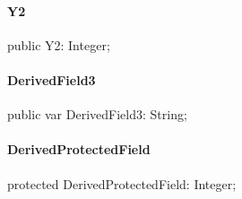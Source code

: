 \documentclass{report}
\begin{document}
\paragraph*{Y2}\hspace*{\fill}

\begin{list}{}{
\setlength{\itemindent}{0cm}
\setlength{\listparindent}{0cm}
\setlength{\leftmargin}{\evensidemargin}
\addtolength{\leftmargin}{\tmplength}
\settowidth{\labelsep}{X}
\addtolength{\leftmargin}{\labelsep}
\setlength{\labelwidth}{\tmplength}
}
\begin{flushleft}
\item[\textbf{Declaration}\hfill]
\begin{ttfamily}
public Y2: Integer;\end{ttfamily}


\end{flushleft}
\end{list}
\paragraph*{DerivedField3}\hspace*{\fill}

\begin{list}{}{
\setlength{\itemindent}{0cm}
\setlength{\listparindent}{0cm}
\setlength{\leftmargin}{\evensidemargin}
\addtolength{\leftmargin}{\tmplength}
\settowidth{\labelsep}{X}
\addtolength{\leftmargin}{\labelsep}
\setlength{\labelwidth}{\tmplength}
}
\begin{flushleft}
\item[\textbf{Declaration}\hfill]
\begin{ttfamily}
public var DerivedField3: String;\end{ttfamily}


\end{flushleft}
\end{list}
\paragraph*{DerivedProtectedField}\hspace*{\fill}

\begin{list}{}{
\setlength{\itemindent}{0cm}
\setlength{\listparindent}{0cm}
\setlength{\leftmargin}{\evensidemargin}
\addtolength{\leftmargin}{\tmplength}
\settowidth{\labelsep}{X}
\addtolength{\leftmargin}{\labelsep}
\setlength{\labelwidth}{\tmplength}
}
\begin{flushleft}
\item[\textbf{Declaration}\hfill]
\begin{ttfamily}
protected DerivedProtectedField: Integer;\end{ttfamily}


\end{flushleft}
\end{list}
\end{document}
